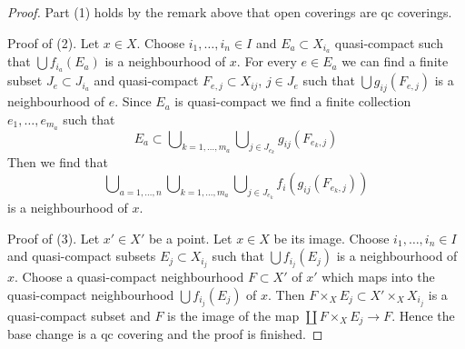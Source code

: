 \documentclass[10pt,a4paper]{amsart}
\theoremstyle{plain}
\theoremstyle{definition}
\theoremstyle{remark}
\numberwithin{equation}{subsection}
\begin{document}
\begin{proof}
Part (1) holds by the remark above that open coverings are qc coverings.

\medskip\noindent
Proof of (2). Let $x \in X$. Choose $i_1, \ldots, i_n \in I$ and
$E_a \subset X_{i_a}$ quasi-compact such that $\bigcup f_{i_a}(E_a)$
is a neighbourhood of $x$. For every $e \in E_a$ we can find
a finite subset $J_e \subset J_{i_a}$ and quasi-compact
$F_{e, j} \subset X_{ij}$, $j \in J_e$ such that $\bigcup g_{ij}(F_{e, j})$
is a neighbourhood of $e$. Since $E_a$ is quasi-compact we find
a finite collection $e_1, \ldots, e_{m_a}$ such that
$$
E_a \subset
\bigcup\nolimits_{k = 1, \ldots, m_a}
\bigcup\nolimits_{j \in J_{e_k}} g_{ij}(F_{e_k, j})
$$
Then we find that
$$
\bigcup\nolimits_{a = 1, \ldots, n}
\bigcup\nolimits_{k = 1, \ldots, m_a}
\bigcup\nolimits_{j \in J_{e_k}} f_i(g_{ij}(F_{e_k, j}))
$$
is a neighbourhood of $x$.

\medskip\noindent
Proof of (3). Let $x' \in X'$ be a point. Let $x \in X$ be its image.
Choose $i_1, \ldots, i_n \in I$ and quasi-compact subsets
$E_j \subset X_{i_j}$ such that $\bigcup f_{i_j}(E_j)$ is a
neighbourhood of $x$. Choose a quasi-compact neighbourhood $F \subset X'$
of $x'$ which maps into the quasi-compact neighbourhood
$\bigcup f_{i_j}(E_j)$ of $x$. Then
$F \times_X E_j \subset X' \times_X X_{i_j}$ is a
quasi-compact subset and $F$ is the image of the map
$\coprod F \times_X E_j \to F$. Hence the base change is a
qc covering and the proof is finished.
\end{proof}
\end{document}
